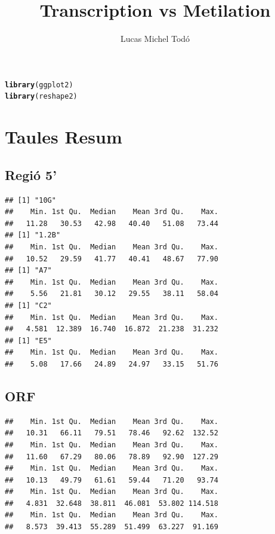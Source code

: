 \documentclass{article}\usepackage[]{graphicx}\usepackage[]{color}
\makeatletter
\newcommand{\hlstd}[1]{\textcolor[rgb]{0.345,0.345,0.345}{#1}}%
\newcommand{\hlkwd}[1]{\textcolor[rgb]{0.737,0.353,0.396}{\textbf{#1}}}%
\newenvironment{kframe}{%
 \def\at@end@of@kframe{}%
 \ifinner\ifhmode%
  \def\at@end@of@kframe{\end{minipage}}%
  \begin{minipage}{\columnwidth}%
 \fi\fi%
 \def\FrameCommand##1{\hskip\@totalleftmargin \hskip-\fboxsep
 \colorbox{shadecolor}{##1}\hskip-\fboxsep
     \hskip-\linewidth \hskip-\@totalleftmargin \hskip\columnwidth}%
 \MakeFramed {\advance\hsize-\width
   \@totalleftmargin\z@ \linewidth\hsize
   \@setminipage}}%
 {\par\unskip\endMakeFramed%
 \at@end@of@kframe}
\newenvironment{knitrout}{}{} %
\makeatother
\begin{document}
\title{Transcription vs Metilation}
\author{Lucas Michel Todó}
\maketitle
\tableofcontents
\clearpage

\begin{knitrout}
\color{fgcolor}\begin{kframe}
\begin{alltt}
\hlkwd{library}\hlstd{(ggplot2)}
\hlkwd{library}\hlstd{(reshape2)}
\end{alltt}
\end{kframe}
\end{knitrout}



\section{Taules Resum}
\subsection{Regió 5'}
\begin{knitrout}
\color{fgcolor}\begin{kframe}
\begin{verbatim}
## [1] "10G"
##    Min. 1st Qu.  Median    Mean 3rd Qu.    Max. 
##   11.28   30.53   42.98   40.40   51.08   73.44 
## [1] "1.2B"
##    Min. 1st Qu.  Median    Mean 3rd Qu.    Max. 
##   10.52   29.59   41.77   40.41   48.67   77.90 
## [1] "A7"
##    Min. 1st Qu.  Median    Mean 3rd Qu.    Max. 
##    5.56   21.81   30.12   29.55   38.11   58.04 
## [1] "C2"
##    Min. 1st Qu.  Median    Mean 3rd Qu.    Max. 
##   4.581  12.389  16.740  16.872  21.238  31.232 
## [1] "E5"
##    Min. 1st Qu.  Median    Mean 3rd Qu.    Max. 
##    5.08   17.66   24.89   24.97   33.15   51.76
\end{verbatim}
\end{kframe}
\end{knitrout}
\subsection{ORF}
\begin{knitrout}
\color{fgcolor}\begin{kframe}
\begin{verbatim}
##    Min. 1st Qu.  Median    Mean 3rd Qu.    Max. 
##   10.31   66.11   79.51   78.46   92.62  132.52 
##    Min. 1st Qu.  Median    Mean 3rd Qu.    Max. 
##   11.60   67.29   80.06   78.89   92.90  127.29 
##    Min. 1st Qu.  Median    Mean 3rd Qu.    Max. 
##   10.13   49.79   61.61   59.44   71.20   93.74 
##    Min. 1st Qu.  Median    Mean 3rd Qu.    Max. 
##   4.831  32.648  38.811  46.081  53.802 114.518 
##    Min. 1st Qu.  Median    Mean 3rd Qu.    Max. 
##   8.573  39.413  55.289  51.499  63.227  91.169
\end{verbatim}
\end{kframe}
\end{knitrout}
\end{document}
